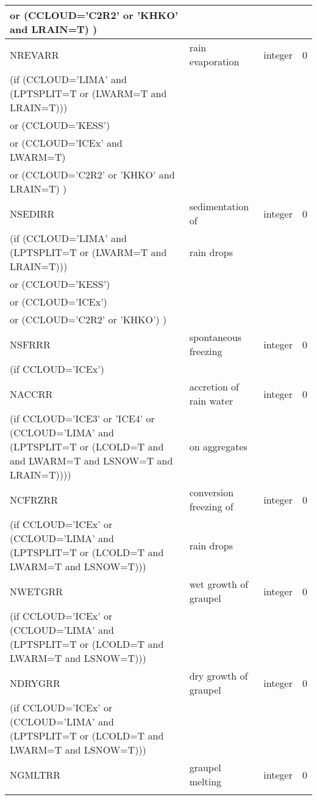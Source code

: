 \begin{longtable} {|p{}|p{}|>{\centering}p{}|p{}<{\centering}|}
 or (CCLOUD='C2R2' or 'KHKO' and LRAIN=T) ) & & & \\ \hline
NREVARR & rain evaporation  & integer  &  0 \index{NREVARR!\innam{NAM\_BU\_RRR}}\\\hline
(if (CCLOUD='LIMA' and (LPTSPLIT=T or (LWARM=T and LRAIN=T))) & & & \\ \nopagebreak
 or (CCLOUD='KESS') & & & \\ \nopagebreak
 or (CCLOUD='ICEx' and LWARM=T) & & & \\ \nopagebreak
 or (CCLOUD='C2R2' or 'KHKO' and LRAIN=T) ) & & & \\ \hline
NSEDIRR   & sedimentation of & integer  &  0 \index{NSEDIRR!\innam{NAM\_BU\_RRR}}\\ \nopagebreak
(if (CCLOUD='LIMA' and (LPTSPLIT=T or (LWARM=T and LRAIN=T))) & rain drops & & \\ \nopagebreak
 or (CCLOUD='KESS') & & & \\ \nopagebreak
 or (CCLOUD='ICEx') & & & \\ \nopagebreak
 or (CCLOUD='C2R2' or 'KHKO') ) & & & \\ \hline
NSFRRR   & spontaneous freezing & integer  &  0 \index{NSFRRR!\innam{NAM\_BU\_RRR}}\\ \nopagebreak
(if CCLOUD='ICEx') & &   &  \\\hline
NACCRR   & accretion of rain water & integer  &  0 \index{NACCRR!\innam{NAM\_BU\_RRR}}\\ \nopagebreak
(if CCLOUD='ICE3' or 'ICE4' or (CCLOUD='LIMA' and (LPTSPLIT=T or (LCOLD=T and and LWARM=T and LSNOW=T and LRAIN=T)))) & on aggregates & & \\\hline
NCFRZRR  & conversion freezing of & integer  &  0 \index{NCFRZRR!\innam{NAM\_BU\_RRR}}\\ \nopagebreak
(if CCLOUD='ICEx' or (CCLOUD='LIMA' and (LPTSPLIT=T or (LCOLD=T and LWARM=T and LSNOW=T))) & rain drops & & \\\hline
NWETGRR  & wet growth of graupel & integer  &  0 \index{NWETGRR!\innam{NAM\_BU\_RRR}}\\ \nopagebreak
(if CCLOUD='ICEx' or (CCLOUD='LIMA' and (LPTSPLIT=T or (LCOLD=T and LWARM=T and LSNOW=T))) & & & \\\hline
NDRYGRR  & dry growth of graupel & integer  &  0 \index{NDRYGRR!\innam{NAM\_BU\_RRR}}\\ \nopagebreak
(if CCLOUD='ICEx' or (CCLOUD='LIMA' and (LPTSPLIT=T or (LCOLD=T and LWARM=T and LSNOW=T))) & & & \\\hline
NGMLTRR  & graupel melting& integer  &  0 \index{NGMLTRR!\innam{NAM\_BU\_RRR}}\\ \nopagebreak

\end{longtable}
